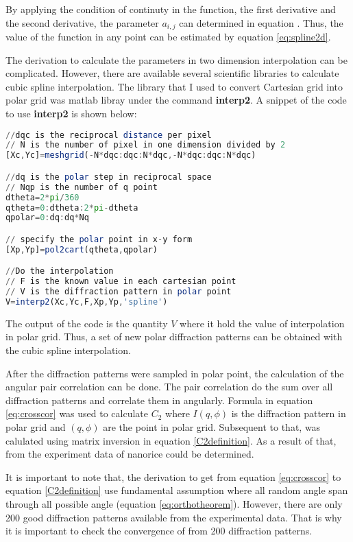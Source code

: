 By applying the condition of continuty in the function, the first derivative and the second derivative, the parameter $a_{i,j}$ can determined in equation \label{eq:spline2d}. Thus, the value of the function in any point can be estimated by equation \ref{eq:spline2d}. 

The derivation to calculate the parameters in two dimension interpolation can be complicated. However, there are available several scientific libraries to calculate cubic spline interpolation. The library that I used to convert Cartesian grid into polar grid was matlab libray under the command \textbf{interp2}. A snippet of the code to use \textbf{interp2} is shown below:
\begin{lstlisting}[language=Octave]
//dqc is the reciprocal distance per pixel
// N is the number of pixel in one dimension divided by 2
[Xc,Yc]=meshgrid(-N*dqc:dqc:N*dqc,-N*dqc:dqc:N*dqc)                                        

//dq is the polar step in reciprocal space
// Nqp is the number of q point
dtheta=2*pi/360
qtheta=0:dtheta:2*pi-dtheta
qpolar=0:dq:dq*Nq          

// specify the polar point in x-y form
[Xp,Yp]=pol2cart(qtheta,qpolar)  

//Do the interpolation 
// F is the known value in each cartesian point
// V is the diffraction pattern in polar point
V=interp2(Xc,Yc,F,Xp,Yp,'spline')
\end{lstlisting}
The output of the code is the quantity $V$ where it hold the value of interpolation in polar grid. Thus, a set of new polar diffraction patterns can be obtained with the cubic spline interpolation. 

After the diffraction patterns were sampled in polar point, the calculation of the angular pair correlation can be done. The pair correlation do the sum over all diffraction patterns and correlate them in angularly. Formula in equation \ref{eq:crosscor} was used to calculate $C_{2}$ where  $I(q,\phi)$ is the diffraction pattern in polar grid and $(q,\phi)$ are the point in polar grid. Subsequent to that, \Blq was calulated using matrix inversion in equation \ref{C2definition}. As a result of that, \Blq from the experiment data of nanorice could be determined.   

It is important to note that, the derivation to get \Blq from equation \ref{eq:crosscor} to equation \ref{C2definition} use fundamental assumption where all random angle span through all possible angle (equation \ref{eq:orthotheorem}). However, there are only 200 good diffraction patterns available from the experimental data. That is why it is important to check the convergence of \Blq from 200 diffraction patterns.    


